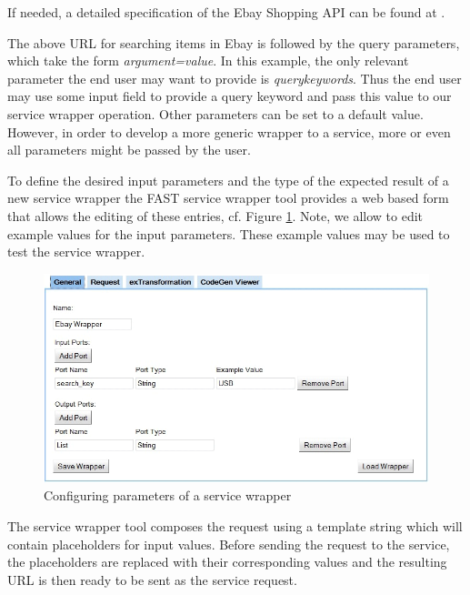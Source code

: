 If needed, a detailed specification of the Ebay Shopping API can be found at \cite{eBayShoppingAPIs}.

The above URL for searching items in Ebay is followed by the query parameters, which take the form \textit{argument=value}. In this example, the only relevant parameter the end user may want to provide is \emph{querykeywords}. Thus the end user may use some input field to provide a query keyword and pass this value to our service wrapper operation. Other parameters can be set to a default value. However, in order to develop a more generic wrapper to a service, more or even all parameters might be passed by the user.

To define the desired input parameters and the type of the expected result of a new service wrapper the FAST service wrapper tool provides a web based form that allows the editing of these entries, cf. Figure \ref{fig:construct_pre_post_conditions}. Note, we allow to edit example values for the input parameters. These example values may be used to test the service wrapper. 

\begin{figure}
  \begin{center} \includegraphics[width=\linewidth]{images/ServiceWrapperToolGVSWithPortDefinitions.png}
    \caption{Configuring parameters of a service wrapper}
    \label{fig:construct_pre_post_conditions}
  \end{center}
\end{figure}

The service wrapper tool composes the request using a template string which will contain placeholders for input values. Before sending the request to the service, the placeholders are replaced with their corresponding values and the resulting URL is then ready to be sent as the service request.

